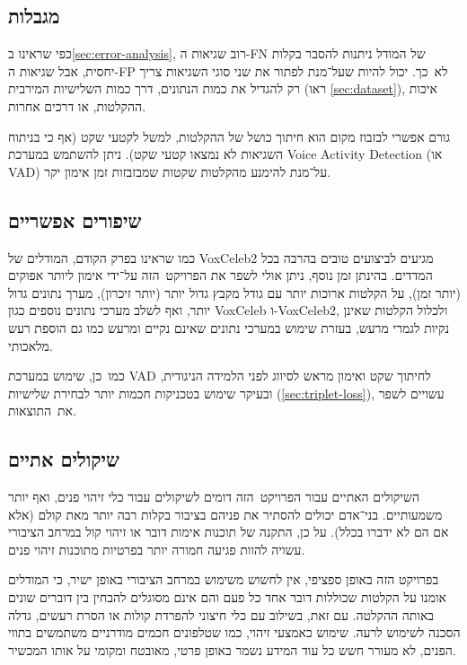 \documentclass[hebrew, a4paper]{article}
\theoremstyle{plain}
\theoremstyle{definition}
\numberwithin{equation}{section}
\begin{document}
\subsection{מגבלות}
\label{sec:limitations}

כפי שראינו ב\autoref{sec:error-analysis}, רוב שגיאות ה-FN של המודל
ניתנות להסבר בקלות יחסית, אבל שגיאות ה-FP לא~כך. יכול להיות שעל־מנת
לפתור את שני סוגי השגיאות צריך רק להגדיל את כמות הנתונים, דרך כמות
השלישיות המירבית (ראו \autoref{sec:dataset}), איכות ההקלטות, או דרכים
אחרות.

גורם אפשרי לבזבוז מקום הוא חיתוך כושל של ההקלטות, למשל לקטעי שקט (אף
כי בניתוח השגיאות לא נמצאו קטעי שקט). ניתן להשתמש במערכת Voice
Activity Detection (או VAD) על־מנת להימנע מהקלטות שקטות שמבזבזות זמן
אימון יקר.

\subsection{שיפורים אפשריים}
\label{sec:discussion-improvements}

כמו שראינו בפרק הקודם, המודלים של VoxCeleb2 מגיעים לביצועים טובים
בהרבה בכל המדדים. בהינתן זמן נוסף, ניתן אולי לשפר את הפרויקט~הזה
על־ידי אימון ליותר אפוקים (יותר זמן), על הקלטות ארוכות יותר עם גודל
מקבץ גדול יותר (יותר זיכרון), מערך נתונים גדול יותר, ואף לשלב מערכי
נתונים נוספים כגון VoxCeleb ו-VoxCeleb2, ולכלול הקלטות שאינן נקיות
לגמרי מרעש, בעזרת שימוש במערכי נתונים שאינם נקיים ומרעש כמו גם הוספת
רעש מלאכותי.

כמו~כן, שימוש במערכת VAD לחיתוך שקט ואימון מראש לסיווג לפני הלמידה
הניגודית, ובעיקר שימוש בטכניקות חכמות יותר לבחירת שלישיות
(\autoref{sec:triplet-loss}), עשויים לשפר את~התוצאות.

\subsection{שיקולים אתיים}
\label{sec:ethics}

השיקולים האתיים עבור הפרויקט~הזה דומים לשיקולים עבור כלי זיהוי פנים,
ואף יותר משמעותיים. בני־אדם יכולים להסתיר את פניהם בציבור בקלות רבה
יותר מאת קולם (אלא אם הם לא ידברו בכלל). על כן, התקנה של תוכנות אימות
דובר או זיהוי קול במרחב הציבורי עשויה להוות פגיעה חמורה יותר בפרטיות
מתוכנות זיהוי פנים.

בפרויקט הזה באופן ספציפי, אין לחשוש משימוש במרחב הציבורי באופן ישיר,
כי המודלים אומנו על הקלטות שכוללות דובר אחד כל פעם והם אינם מסוגלים
להבחין בין דוברים שונים באותה ההקלטה. עם זאת, בשילוב עם כלי חיצוני
להפרדת קולות או הסרת רעשים, גדלה הסכנה לשימוש לרעה. שימוש כאמצעי
זיהוי, כמו שטלפונים חכמים מודרניים משתמשים בתווי הפנים, לא מעורר חשש
כל עוד המידע נשמר באופן פרטי, מאובטח ומקומי על אותו המכשיר.
\end{document}
